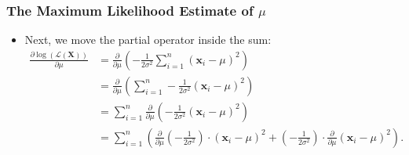 \begin{frame}
	\frametitle{The Maximum Likelihood Estimate of $\mu$}
	\begin{itemize}
		\item Next, we move the partial operator inside the sum:
		      \begin{align}
			      \frac{\partial \log\left(\mathcal{L}(\mathbf{X})\right)}{\partial \mu} & = \frac{\partial}{\partial\mu}\left(-\frac{1}{2\sigma^2} \sum_{i=1}^{n} (\mathbf{x}_i-\mu)^2 \right)                                                                                                                     \\
			                                                                             & = \frac{\partial}{\partial\mu}\left(\sum_{i=1}^{n}-\frac{1}{2\sigma^2} (\mathbf{x}_i-\mu)^2 \right)                                                                                                                      \\
			                                                                             & = \sum_{i=1}^{n} \frac{\partial}{\partial\mu}\left(-\frac{1}{2\sigma^2} (\mathbf{x}_i-\mu)^2\right)                                                                                                                      \\
			                                                                             & = \sum_{i=1}^{n} \left(\frac{\partial}{\partial\mu}\left(-\frac{1}{2\sigma^2}\right) \cdot (\mathbf{x}_i - \mu)^2 + \left( - \frac{1}{2\sigma^2} \right) \cdot \frac{\partial}{\partial\mu} (\mathbf{x}_i-\mu)^2\right).
		      \end{align}
	\end{itemize}
\end{frame}


